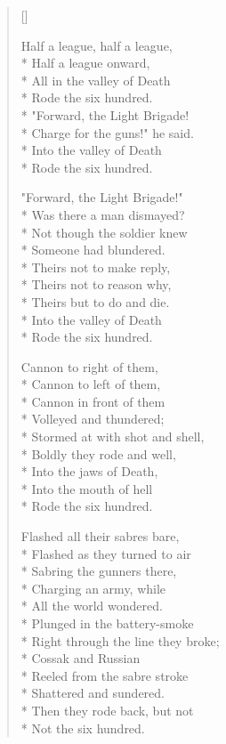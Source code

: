 \documentclass{article}
\begin{document}
\settowidth{\versewidth}{Stormed at with shot and shell,}

\newcommand{\attrib}[1]{%
  \nopagebreak{\raggedleft\footnotesize #1\par}}

\begin{verse}[\versewidth]

Half a league, half a league, \\*    
Half a league onward, \\*
All in the valley of Death \\*
\vin Rode the six hundred. \\*
"Forward, the Light Brigade! \\*
Charge for the guns!" he said. \\*
Into the valley of Death \\*
\vin Rode the six hundred. 

"Forward, the Light Brigade!"  \\*
Was there a man dismayed?  \\*
Not though the soldier knew  \\*
\vin Someone had blundered.  \\*
\vin Theirs not to make reply,  \\*
\vin Theirs not to reason why,  \\*
\vin Theirs but to do and die.  \\*
\vin Into the valley of Death  \\*
\vin Rode the six hundred.  

Cannon to right of them,  \\*
Cannon to left of them,  \\*
Cannon in front of them  \\*
\vin Volleyed and thundered;  \\*
Stormed at with shot and shell,  \\*
Boldly they rode and well,  \\*
Into the jaws of Death,  \\*
Into the mouth of hell  \\*
\vin Rode the six hundred.

Flashed all their sabres bare,  \\*
Flashed as they turned to air  \\*
Sabring the gunners there, \\*
Charging an army, while \\*
\vin All the world wondered. \\*
Plunged in the battery-smoke \\*
Right through the line they broke; \\*
Cossak and Russian \\*
Reeled from the sabre stroke \\*
\vin Shattered and sundered. \\*
Then they rode back, but not \\*
\vin Not the six hundred.


\end{verse}
\end{document}
